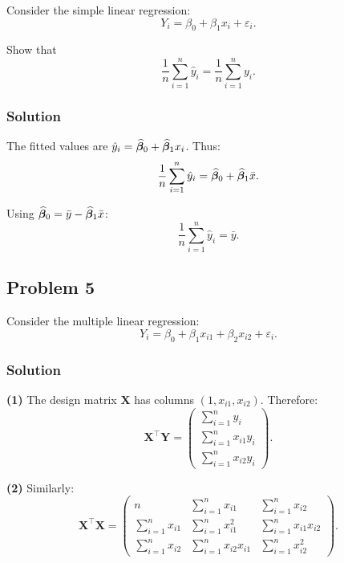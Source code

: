 Consider the simple linear regression:
\[
Y_i = \beta_0 + \beta_1 x_i + \varepsilon_i.
\]

Show that
\[
\frac{1}{n}\sum_{i=1}^n \hat{y}_i = \frac{1}{n}\sum_{i=1}^n y_i.
\]

\subsubsection*{Solution}

The fitted values are $\hat{y}_i = \widehat{\boldsymbol{\beta}}_0 + \widehat{\boldsymbol{\beta}}_1 x_i$. Thus:
\[
\frac{1}{n}\sum_{i=1}^n \hat{y}_i
= \widehat{\boldsymbol{\beta}}_0 + \widehat{\boldsymbol{\beta}}_1 \bar{x}.
\]

Using $\widehat{\boldsymbol{\beta}}_0 = \bar{y} - \widehat{\boldsymbol{\beta}}_1 \bar{x}$:
\[
\frac{1}{n}\sum_{i=1}^n \hat{y}_i = \bar{y}.
\]

\subsection{Problem 5}

Consider the multiple linear regression:
\[
Y_i = \beta_0 + \beta_1 x_{i1} + \beta_2 x_{i2} + \varepsilon_i.
\]

\subsubsection*{Solution}

\textbf{(1)} The design matrix $\mathbf{X}$ has columns $(1, x_{i1}, x_{i2})$. Therefore:
\[
\mathbf{X}^\top \mathbf{Y} =
\begin{pmatrix}
\sum_{i=1}^n y_i \\
\sum_{i=1}^n x_{i1} y_i \\
\sum_{i=1}^n x_{i2} y_i
\end{pmatrix}.
\]

\textbf{(2)} Similarly:
\[
\mathbf{X}^\top \mathbf{X} =
\begin{pmatrix}
n & \sum_{i=1}^n x_{i1} & \sum_{i=1}^n x_{i2} \\
\sum_{i=1}^n x_{i1} & \sum_{i=1}^n x_{i1}^2 & \sum_{i=1}^n x_{i1}x_{i2} \\
\sum_{i=1}^n x_{i2} & \sum_{i=1}^n x_{i2}x_{i1} & \sum_{i=1}^n x_{i2}^2
\end{pmatrix}.
\]

\clearpage
